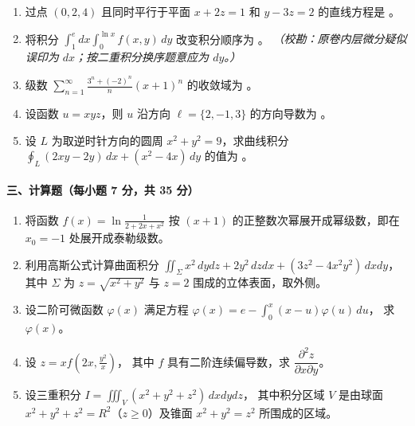 \begin{enumerate}
  \item 过点 $(0,2,4)$ 且同时平行于平面 $x+2z=1$ 和 $y-3z=2$ 的直线方程是 \underline{\hspace{4cm}}。

  \item 将积分 \(\displaystyle \int_1^e dx\int_0^{\ln x} f(x,y)\,dy\)
  改变积分顺序为 \underline{\hspace{4cm}}。
  \textit{（校勘：原卷内层微分疑似误印为 $dx$；按二重积分换序题意应为 $dy$。）}

  \item 级数 \(\displaystyle \sum_{n=1}^{\infty}\frac{3^n+(-2)^n}{n}(x+1)^n\)
  的收敛域为 \underline{\hspace{4cm}}。

  \item 设函数 $u=xyz$，则 $u$ 沿方向 $\ell=\{2,-1,3\}$ 的方向导数为 \underline{\hspace{4cm}}。

  \item 设 $L$ 为取逆时针方向的圆周 $x^2+y^2=9$，求曲线积分 \(\displaystyle \oint_L (2xy-2y)\,dx+(x^2-4x)\,dy\)
  的值为 \underline{\hspace{4cm}}。
\end{enumerate}

\paragraph*{三、计算题（每小题 7 分，共 35 分）}

\begin{enumerate}
  \item 将函数 \(\displaystyle f(x)=\ln\frac{1}{2+2x+x^2}\)
  按 $(x+1)$ 的正整数次幂展开成幂级数，即在 $x_0=-1$ 处展开成泰勒级数。

  \item 利用高斯公式计算曲面积分 \(\displaystyle \iint_{\Sigma}x^2\,dydz+2y^2\,dzdx+(3z^2-4x^2y^2)\,dxdy\)，
  其中 $\Sigma$ 为 $z=\sqrt{x^2+y^2}$ 与 $z=2$ 围成的立体表面，取外侧。

  \item 设二阶可微函数 $\varphi(x)$ 满足方程 \(\displaystyle \varphi(x)=e-\int_0^x (x-u)\varphi(u)\,du\)，
  求 $\varphi(x)$。

  \item 设 \(\displaystyle z=xf\left(2x,\frac{y^2}{x}\right)\)，
  其中 $f$ 具有二阶连续偏导数，求 $\dfrac{\partial^2 z}{\partial x\partial y}$。

  \item 设三重积分 \(\displaystyle I=\iiint_V (x^2+y^2+z^2)\,dxdydz\)，
  其中积分区域 $V$ 是由球面 $x^2+y^2+z^2=R^2$（$z\ge 0$）及锥面 $x^2+y^2=z^2$ 所围成的区域。
\end{enumerate}

